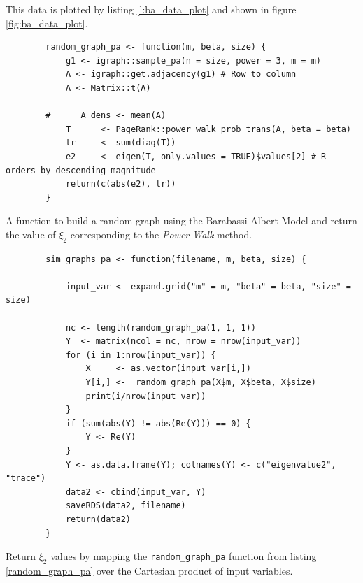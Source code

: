 \documentclass[11pt]{report}
\begin{document}
This data is plotted by listing \ref{l:ba_data_plot} and shown in figure \ref{fig:ba_data_plot}.

\begin{listing}[htbp]
    \begin{tcolorbox}
        \begin{verbatim}
        random_graph_pa <- function(m, beta, size) {
            g1 <- igraph::sample_pa(n = size, power = 3, m = m)
            A <- igraph::get.adjacency(g1) # Row to column
            A <- Matrix::t(A)

        #      A_dens <- mean(A)
            T      <- PageRank::power_walk_prob_trans(A, beta = beta)
            tr     <- sum(diag(T))
            e2     <- eigen(T, only.values = TRUE)$values[2] # R orders by descending magnitude
            return(c(abs(e2), tr))
        }
        \end{verbatim}
    \end{tcolorbox}
\caption{\label{random_graph_pa}A function to build a random graph using the Barabassi-Albert Model and return the value of \(\xi_{2}\) corresponding to the \emph{Power Walk} method.}
\end{listing}

\begin{listing}[htbp]
    \begin{tcolorbox}
        \begin{verbatim}
        sim_graphs_pa <- function(filename, m, beta, size) {

            input_var <- expand.grid("m" = m, "beta" = beta, "size" = size)

            nc <- length(random_graph_pa(1, 1, 1))
            Y  <- matrix(ncol = nc, nrow = nrow(input_var))
            for (i in 1:nrow(input_var)) {
                X     <- as.vector(input_var[i,])
                Y[i,] <-  random_graph_pa(X$m, X$beta, X$size)
                print(i/nrow(input_var))
            }
            if (sum(abs(Y) != abs(Re(Y))) == 0) {
                Y <- Re(Y)
            }
            Y <- as.data.frame(Y); colnames(Y) <- c("eigenvalue2", "trace")
            data2 <- cbind(input_var, Y)
            saveRDS(data2, filename)
            return(data2)
        }
        \end{verbatim}
    \end{tcolorbox}
\caption{\label{sim_graphs_pa}Return \(\xi_{2}\) values by mapping the \texttt{random\_graph\_pa} function from listing \ref{random_graph_pa} over the Cartesian product of input variables.}
\end{listing}
\end{document}
